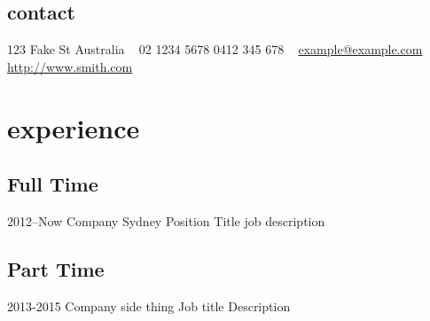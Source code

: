 \documentclass[]{friggeri-cv} %
\begin{document}
 



\begin{aside} %
\section{contact}
123 Fake St
Australia
~ 
02 1234 5678
0412 345 678
~  
\href{mailto:example@example.com}{example@example.com}
\href{http://www.smith.com}{http://www.smith.com}
\end{aside}




\section{experience}
 
\subsection{Full Time}

\begin{entrylist}


\entry 
{2012--Now}
{Company}
{Sydney}%
{Position Title}
{
job description
}


\end{entrylist}

\subsection{Part Time}

\begin{entrylist}


\entry
{2013-2015}
{Company} 
{side thing}
{Job title}
{ 
Description
}




\end{entrylist}
\end{document}
